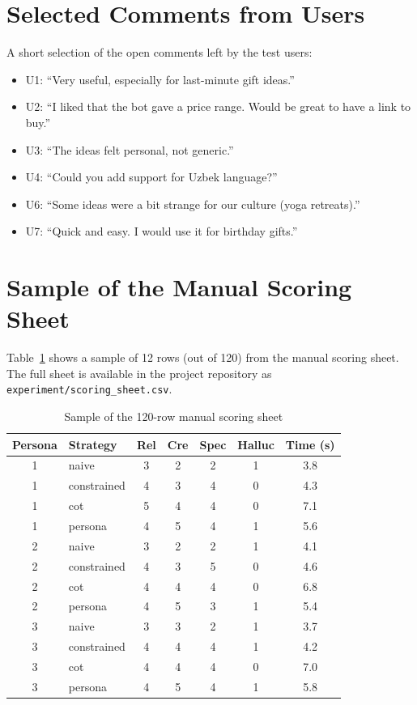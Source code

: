 \section{Selected Comments from Users}

A short selection of the open comments left by the test users:

\begin{itemize}
    \item U1: ``Very useful, especially for last-minute gift ideas.''
    \item U2: ``I liked that the bot gave a price range. Would be great to have a link to buy.''
    \item U3: ``The ideas felt personal, not generic.''
    \item U4: ``Could you add support for Uzbek language?''
    \item U6: ``Some ideas were a bit strange for our culture (yoga retreats).''
    \item U7: ``Quick and easy. I would use it for birthday gifts.''
\end{itemize}

\section{Sample of the Manual Scoring Sheet}

Table~\ref{tab:scoring-sample} shows a sample of 12 rows (out of 120) from the manual scoring sheet. The full sheet is available in the project repository as \texttt{experiment/scoring\_sheet.csv}.

\begin{table}[H]
\centering
\caption{Sample of the 120-row manual scoring sheet}
\label{tab:scoring-sample}
\small
\begin{tabular}{clccccc}
\toprule
\textbf{Persona} & \textbf{Strategy} & \textbf{Rel} & \textbf{Cre} & \textbf{Spec} & \textbf{Halluc} & \textbf{Time (s)} \\
\midrule
1  & naive       & 3 & 2 & 2 & 1 & 3.8 \\
1  & constrained & 4 & 3 & 4 & 0 & 4.3 \\
1  & cot         & 5 & 4 & 4 & 0 & 7.1 \\
1  & persona     & 4 & 5 & 4 & 1 & 5.6 \\
\midrule
2  & naive       & 3 & 2 & 2 & 1 & 4.1 \\
2  & constrained & 4 & 3 & 5 & 0 & 4.6 \\
2  & cot         & 4 & 4 & 4 & 0 & 6.8 \\
2  & persona     & 4 & 5 & 3 & 1 & 5.4 \\
\midrule
3  & naive       & 3 & 3 & 2 & 1 & 3.7 \\
3  & constrained & 4 & 4 & 4 & 1 & 4.2 \\
3  & cot         & 4 & 4 & 4 & 0 & 7.0 \\
3  & persona     & 4 & 5 & 4 & 1 & 5.8 \\
\bottomrule
\end{tabular}
\end{table}

